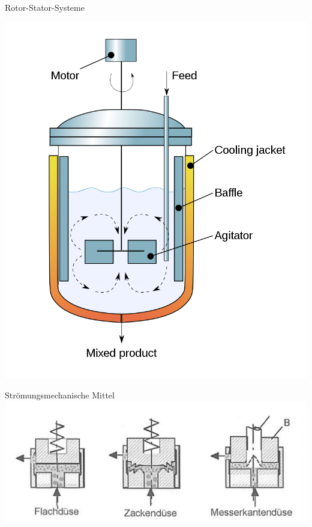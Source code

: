 \documentclass{beamer} %
\begin{document}
\begin{frame}{Rotor-Stator-Systeme}
\begin{minipage}{0.45\linewidth}
		\includegraphics[width=1.1\linewidth]{Markus/Ruehrwerk.png}
	\end{minipage}
\end{frame}


\begin{frame}{Strömungsmechanische Mittel}
	\includegraphics[width=\linewidth]{Markus/Radialdiffusoren}
\end{frame}
\end{document}
